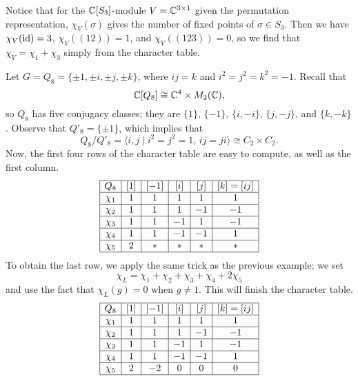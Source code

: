 \begin{remark}
    Notice that for the $\mathbb{C}[S_3]$-module $V = \mathbb{C}^{3\times1}$ given the permutation 
    representation, $\chi_V(\sigma)$ gives the number of fixed points of 
    $\sigma \in S_3$. Then we have $\chi_V(\operatorname{id}) = 3$, $\chi_V((12)) = 1$, and 
    $\chi_V((123)) = 0$, so we find that $\chi_V = \chi_1 + \chi_3$ simply from 
    the character table. 
\end{remark}

\begin{exmp}
    Let $G = Q_8 = \{\pm1, \pm i, \pm j, \pm k\}$, where $ij = k$ and 
    $i^2 = j^2 = k^2 = -1$. Recall that 
    \[ \mathbb{C}[Q_8] \cong \mathbb{C}^4 \times M_2(\mathbb{C}), \] 
    so $Q_8$ has five conjugacy classes; they are $\{1\}$, $\{-1\}$, 
    $\{i, -i\}$, $\{j, -j\}$, and $\{k, -k\}$. Observe that $Q'_8 = \{\pm1\}$, 
    which implies that 
    \[ Q_8/Q'_8 = \langle i, j \mid i^2 = j^2 = 1,\, ij = ji 
    \rangle \cong C_2 \times C_2 . \] 
    Now, the first four rows of the character table are easy to compute, 
    as well as the first column. 
    \begin{align*}
        \begin{array}{|c|c|c|c|c|c|}
            \hline
            Q_8    & [1] & [-1] & [i] & [j] & [k] = [ij] \\ \hline
            \chi_1 & 1   & 1    & 1   & 1   & 1          \\ \hline
            \chi_2 & 1   & 1    & 1   & -1  & -1         \\ \hline
            \chi_3 & 1   & 1    & -1  & 1   & -1         \\ \hline
            \chi_4 & 1   & 1    & -1  & -1  & 1          \\ \hline
            \chi_5 & 2   & *    & *   & *   & *          \\ \hline 
        \end{array} 
    \end{align*}
    To obtain the last row, we apply the same trick as the previous example; 
    we set 
    \[ \chi_L = \chi_1 + \chi_2 + \chi_3 + \chi_4 + 2\chi_5 \] 
    and use the fact that $\chi_L(g) = 0$ when $g \neq 1$. This will finish 
    the character table.
    \begin{align*}
        \begin{array}{|c|c|c|c|c|c|}
            \hline
            Q_8    & [1] & [-1] & [i] & [j] & [k] = [ij] \\ \hline
            \chi_1 & 1   & 1    & 1   & 1   & 1          \\ \hline
            \chi_2 & 1   & 1    & 1   & -1  & -1         \\ \hline
            \chi_3 & 1   & 1    & -1  & 1   & -1         \\ \hline
            \chi_4 & 1   & 1    & -1  & -1  & 1          \\ \hline
            \chi_5 & 2   & -2   & 0   & 0   & 0          \\ \hline 
        \end{array} 
    \end{align*} 
\end{exmp}

